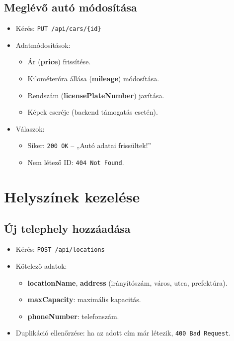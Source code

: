 \documentclass{report}[11pt]
\begin{document}
\subsection{Meglévő autó módosítása}
\begin{itemize}
    \item Kérés: \texttt{PUT /api/cars/\{id\}}
    \item Adatmódosítások:
    \begin{itemize}
        \item Ár (\textbf{price}) frissítése.
        \item Kilométeróra állása (\textbf{mileage}) módosítása.
        \item Rendszám (\textbf{licensePlateNumber}) javítása.
        \item Képek cseréje (backend támogatás esetén).
    \end{itemize}
    \item Válaszok:
    \begin{itemize}
        \item Siker: \texttt{200 OK} – „Autó adatai frissültek!”
        \item Nem létező ID: \texttt{404 Not Found}.
    \end{itemize}
\end{itemize}

\section{Helyszínek kezelése}
\subsection{Új telephely hozzáadása}
\begin{itemize}
    \item Kérés: \texttt{POST /api/locations}
    \item Kötelező adatok:
    \begin{itemize}
        \item \textbf{locationName}, \textbf{address} (irányítószám, város, utca, prefektúra).
        \item \textbf{maxCapacity}: maximális kapacitás.
        \item \textbf{phoneNumber}: telefonszám.
    \end{itemize}
    \item Duplikáció ellenőrzése: ha az adott cím már létezik, \texttt{400 Bad Request}.
\end{itemize}
\end{document}
